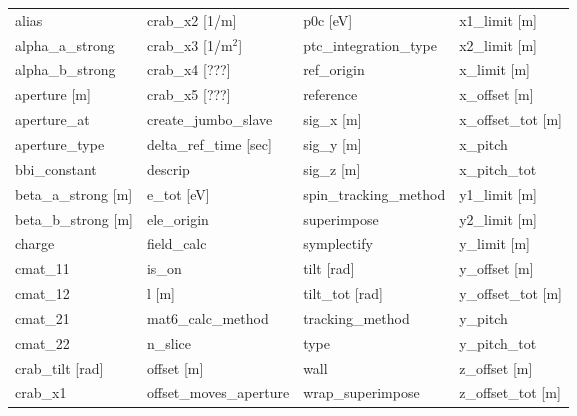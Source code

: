  \begin{tabular}{llll} \toprule
alias                            & crab_x2 [1/m]                    & p0c [eV]                         & x1_limit [m]                     \\
alpha_a_strong                   & crab_x3 [1/m$^2$]                & ptc_integration_type             & x2_limit [m]                     \\
alpha_b_strong                   & crab_x4 [???]                    & ref_origin                       & x_limit [m]                      \\
aperture [m]                     & crab_x5 [???]                    & reference                        & x_offset [m]                     \\
aperture_at                      & create_jumbo_slave               & sig_x [m]                        & x_offset_tot [m]                 \\
aperture_type                    & delta_ref_time [sec]             & sig_y [m]                        & x_pitch                          \\
bbi_constant                     & descrip                          & sig_z [m]                        & x_pitch_tot                      \\
beta_a_strong [m]                & e_tot [eV]                       & spin_tracking_method             & y1_limit [m]                     \\
beta_b_strong [m]                & ele_origin                       & superimpose                      & y2_limit [m]                     \\
charge                           & field_calc                       & symplectify                      & y_limit [m]                      \\
cmat_11                          & is_on                            & tilt [rad]                       & y_offset [m]                     \\
cmat_12                          & l [m]                            & tilt_tot [rad]                   & y_offset_tot [m]                 \\
cmat_21                          & mat6_calc_method                 & tracking_method                  & y_pitch                          \\
cmat_22                          & n_slice                          & type                             & y_pitch_tot                      \\
crab_tilt [rad]                  & offset [m]                       & wall                             & z_offset [m]                     \\
crab_x1                          & offset_moves_aperture            & wrap_superimpose                 & z_offset_tot [m]                 \\
 \bottomrule
 \end{tabular}
 \vfill
 
